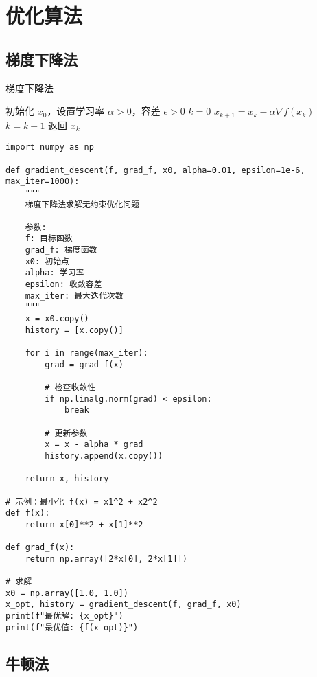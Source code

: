 \section{优化算法}\label{app:optimization-algorithms}

\subsection{梯度下降法}

\begin{algorithm}[H]
\caption{梯度下降法}\label{alg:gradient-descent}
\begin{algorithmic}[1]
\State 初始化 $x_0$，设置学习率 $\alpha > 0$，容差 $\epsilon > 0$
\State $k = 0$
    \State $x_{k+1} = x_k - \alpha \nabla f(x_k)$
    \State $k = k + 1$
\EndWhile
\State 返回 $x_k$
\end{algorithmic}
\end{algorithm}

\begin{codebox}[title=梯度下降法的 Python 实现]
\begin{verbatim}
import numpy as np

def gradient_descent(f, grad_f, x0, alpha=0.01, epsilon=1e-6, max_iter=1000):
    """
    梯度下降法求解无约束优化问题
    
    参数:
    f: 目标函数
    grad_f: 梯度函数
    x0: 初始点
    alpha: 学习率
    epsilon: 收敛容差
    max_iter: 最大迭代次数
    """
    x = x0.copy()
    history = [x.copy()]
    
    for i in range(max_iter):
        grad = grad_f(x)
        
        # 检查收敛性
        if np.linalg.norm(grad) < epsilon:
            break
        
        # 更新参数
        x = x - alpha * grad
        history.append(x.copy())
    
    return x, history

# 示例：最小化 f(x) = x1^2 + x2^2
def f(x):
    return x[0]**2 + x[1]**2

def grad_f(x):
    return np.array([2*x[0], 2*x[1]])

# 求解
x0 = np.array([1.0, 1.0])
x_opt, history = gradient_descent(f, grad_f, x0)
print(f"最优解: {x_opt}")
print(f"最优值: {f(x_opt)}")
\end{verbatim}
\end{codebox}

\subsection{牛顿法}

